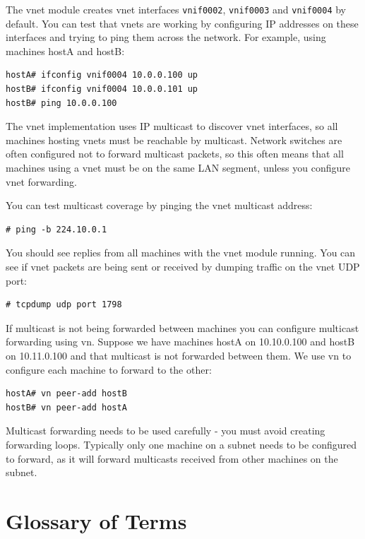 \documentclass[11pt,twoside,final,openright]{report}
\begin{document}
The vnet module creates vnet interfaces \texttt{vnif0002},
\texttt{vnif0003} and \texttt{vnif0004} by default. You can test that
vnets are working by configuring IP addresses on these interfaces
and trying to ping them across the network. For example, using machines
hostA and hostB:
\begin{verbatim}
hostA# ifconfig vnif0004 10.0.0.100 up
hostB# ifconfig vnif0004 10.0.0.101 up
hostB# ping 10.0.0.100
\end{verbatim}

The vnet implementation uses IP multicast to discover vnet interfaces, so
all machines hosting vnets must be reachable by multicast. Network switches
are often configured not to forward multicast packets, so this often
means that all machines using a vnet must be on the same LAN segment,
unless you configure vnet forwarding.

You can test multicast coverage by pinging the vnet multicast address:
\begin{verbatim}
# ping -b 224.10.0.1
\end{verbatim}
You should see replies from all machines with the vnet module running.
You can see if vnet packets are being sent or received by dumping traffic
on the vnet UDP port:
\begin{verbatim}
# tcpdump udp port 1798
\end{verbatim}

If multicast is not being forwarded between machines you can configure
multicast forwarding using vn. Suppose we have machines hostA on 10.10.0.100
and hostB on 10.11.0.100 and that multicast is not forwarded between them.
We use vn to configure each machine to forward to the other:
\begin{verbatim}
hostA# vn peer-add hostB
hostB# vn peer-add hostA
\end{verbatim}
Multicast forwarding needs to be used carefully - you must avoid creating forwarding
loops. Typically only one machine on a subnet needs to be configured to forward,
as it will forward multicasts received from other machines on the subnet.

\chapter{Glossary of Terms}
\end{document}
